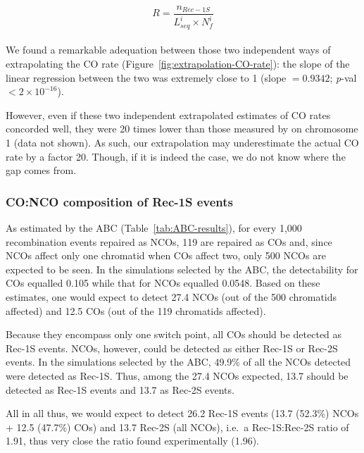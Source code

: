 \begin{equation*}
    R = \frac{n_{Rec-1S}}{L^{i}_{seq} \times N^{i}_{f}}
\end{equation*}\\



We found a remarkable adequation between those two independent ways of extrapolating the CO rate (Figure~\ref{fig:extrapolation-CO-rate}): the slope of the linear regression between the two was extremely close to 1 (slope $ =0.9342$; \textit{p}-val $< 2 \times 10^{-16}$).


However, even if these two independent extrapolated estimates of CO rates concorded well, they were 20 times lower than those measured by \citet{paigen2008recombinational} on chromosome 1 (data not shown). 
As such, our extrapolation may underestimate the actual CO rate by a factor 20. Though, if it is indeed the case, we do not know where the gap comes from.






\subsubsection{CO:NCO composition of Rec-1S events}

As estimated by the ABC (Table~\ref{tab:ABC-results}), for every 1,000 recombination events repaired as NCOs, 119 are repaired as COs and, since NCOs affect only one chromatid when COs affect two, only 500 NCOs are expected to be seen. 
In the simulations selected by the ABC, the detectability for COs equalled 0.105 while that for NCOs equalled 0.0548. 
Based on these estimates, one would expect to detect 27.4 NCOs (out of the 500 chromatids affected) and 12.5 COs (out of the 119 chromatids affected).

Because they encompass only one switch point, all COs should be detected as Rec-1S events.
NCOs, however, could be detected as either Rec-1S or Rec-2S events. 
In the simulations selected by the ABC, 49.9\% of all the NCOs detected were detected as Rec-1S. 
Thus, among the 27.4 NCOs expected, 13.7 should be detected as Rec-1S events and 13.7 as Rec-2S events. 

All in all thus, we would expect to detect 26.2 Rec-1S events (13.7 (52.3\%) NCOs + 12.5 (47.7\%) COs) and 13.7 Rec-2S (all NCOs), i.e.\ a Rec-1S:Rec-2S ratio of 1.91, thus very close the ratio found experimentally (1.96).




